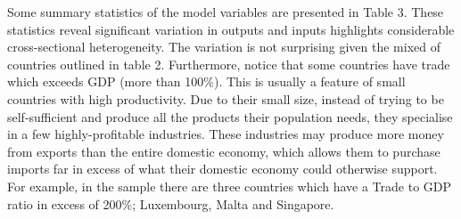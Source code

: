 \documentclass[
  10pt,
]{article}
\begin{document}
Some summary statistics of the model variables are presented in Table 3.
These statistics reveal significant variation in outputs and inputs
highlights considerable cross-sectional heterogeneity. The variation is
not surprising given the mixed of countries outlined in table 2.
Furthermore, notice that some countries have trade which exceeds GDP
(more than 100\%). This is usually a feature of small countries with
high productivity. Due to their small size, instead of trying to be
self-sufficient and produce all the products their population needs,
they specialise in a few highly-profitable industries. These industries
may produce more money from exports than the entire domestic economy,
which allows them to purchase imports far in excess of what their
domestic economy could otherwise support. For example, in the sample
there are three countries which have a Trade to GDP ratio in excess of
200\%; Luxembourg, Malta and Singapore.

\newpage
\end{document}
